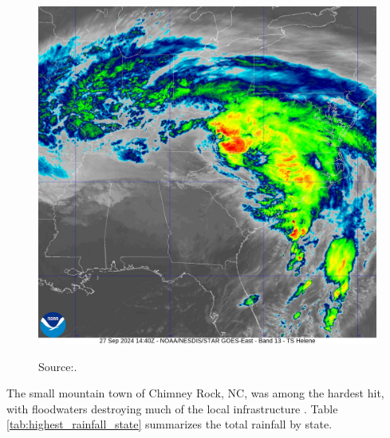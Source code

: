 \begin{figure}[h!]
\begin{minipage}[t]{0.45\textwidth}
		\includegraphics[width=\textwidth]{docs/figuras/chapter6/20242711440_GOES16-ABI-FL-13-AL092024-2000x2000.jpg}
	\end{minipage}
	
	\vspace{0.5em}
	
	\label{fig:northcarolina}
	
	\centering
	Source:.
\end{figure}

The small mountain town of Chimney Rock, NC, was among the hardest hit, with floodwaters destroying much of the local infrastructure \cite{britannica_helene}. Table \ref{tab:highest_rainfall_state} summarizes the total rainfall by state.

